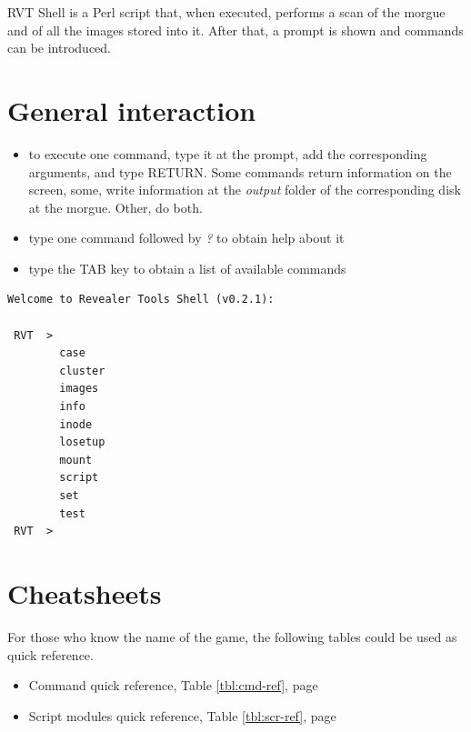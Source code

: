 \documentclass[a4paper,11pt,oneside]{report}
\begin{document}
RVT Shell is a Perl script that, when executed, performs a scan of the morgue and of all the images stored into it. After that, a prompt is shown and commands can be introduced.



\section{General interaction}

\begin{itemize}
\item to execute one command, type it at the prompt, add the corresponding arguments, and type RETURN. Some commands return information on the screen, some, write information at the \emph{output} folder of the corresponding disk at the morgue. Other, do both.

\item type one command followed by \emph{?} to obtain help about it

\item type the TAB key to obtain a list of available commands

\end{itemize}

\begin{verbatim}
Welcome to Revealer Tools Shell (v0.2.1):

 RVT  > 
        case
        cluster
        images
        info
        inode
        losetup
        mount
        script
        set
        test
 RVT  > 
\end{verbatim}





\section{Cheatsheets}

For those who know the name of the game, the following tables could be used as quick reference.

\begin{itemize}
\item Command quick reference, Table \ref{tbl:cmd-ref}, page \pageref{tbl:cmd-ref}
\item Script modules quick reference, Table \ref{tbl:scr-ref}, page \pageref{tbl:scr-ref}
\end{itemize}
\end{document}
